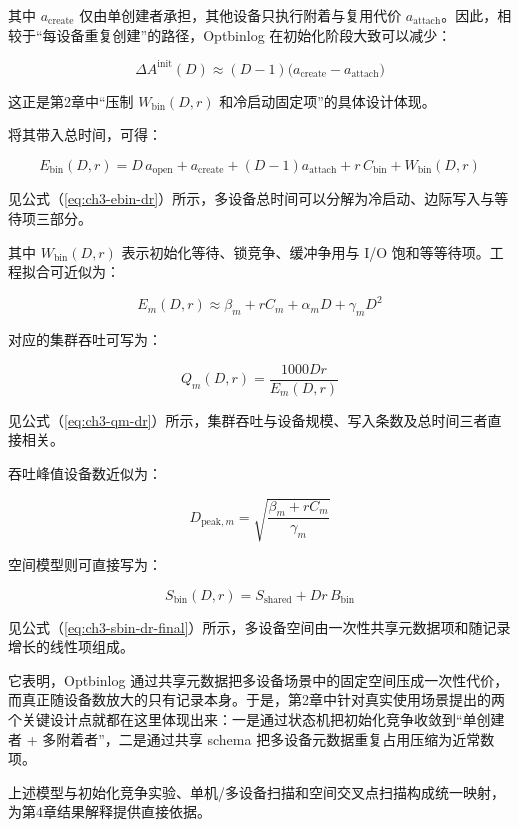 其中 \(a_{\text{create}}\) 仅由单创建者承担，其他设备只执行附着与复用代价 \(a_{\text{attach}}\)。因此，相较于``每设备重复创建''的路径，Optbinlog 在初始化阶段大致可以减少：

\[
\Delta A^{\text{init}}(D)\approx(D-1)\bigl(a_{\text{create}}-a_{\text{attach}}\bigr)
\]

这正是第2章中``压制 \(W_{\text{bin}}(D,r)\) 和冷启动固定项''的具体设计体现。

将其带入总时间，可得：

\begin{equation}
E_{\text{bin}}(D,r)=D\,a_{\text{open}}+a_{\text{create}}+(D-1)a_{\text{attach}}+r\,C_{\text{bin}}+W_{\text{bin}}(D,r)
\label{eq:ch3-ebin-dr}
\end{equation}

见公式（\ref{eq:ch3-ebin-dr}）所示，多设备总时间可以分解为冷启动、边际写入与等待项三部分。

其中 \(W_{\text{bin}}(D,r)\) 表示初始化等待、锁竞争、缓冲争用与 I/O 饱和等等待项。工程拟合可近似为：

\[
E_m(D,r)\approx\beta_m+rC_m+\alpha_mD+\gamma_mD^2
\]

对应的集群吞吐可写为：

\begin{equation}
Q_m(D,r)=\frac{1000Dr}{E_m(D,r)}
\label{eq:ch3-qm-dr}
\end{equation}

见公式（\ref{eq:ch3-qm-dr}）所示，集群吞吐与设备规模、写入条数及总时间三者直接相关。

吞吐峰值设备数近似为：

\[
D_{\text{peak},m}=\sqrt{\frac{\beta_m+rC_m}{\gamma_m}}
\]

空间模型则可直接写为：

\begin{equation}
S_{\text{bin}}(D,r)=S_{\text{shared}}+Dr\,B_{\text{bin}}
\label{eq:ch3-sbin-dr-final}
\end{equation}

见公式（\ref{eq:ch3-sbin-dr-final}）所示，多设备空间由一次性共享元数据项和随记录增长的线性项组成。

它表明，Optbinlog 通过共享元数据把多设备场景中的固定空间压成一次性代价，而真正随设备数放大的只有记录本身。于是，第2章中针对真实使用场景提出的两个关键设计点就都在这里体现出来：一是通过状态机把初始化竞争收敛到``单创建者 + 多附着者''，二是通过共享 schema 把多设备元数据重复占用压缩为近常数项。

上述模型与初始化竞争实验、单机/多设备扫描和空间交叉点扫描构成统一映射，为第4章结果解释提供直接依据。

